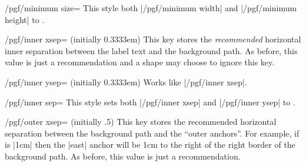 \begin{key}{/pgf/minimum size=}
    This style both |/pgf/minimum width| and |/pgf/minimum height| to .
\end{key}

\begin{key}{/pgf/inner xsep= (initially 0.3333em)}
    This key stores the \emph{recommended} horizontal inner separation between
    the label text and the background path. As before, this value is just a
    recommendation and a shape may choose to ignore this key.
\begin{codeexample}[]
\end{codeexample}
\end{key}

\begin{key}{/pgf/inner ysep= (initially 0.3333em)}
    Works like |/pgf/inner xsep|.
\end{key}

\begin{key}{/pgf/inner sep=}
    This style sets both |/pgf/inner xsep| and |/pgf/inner ysep| to
    .
\end{key}

\begin{key}{/pgf/outer xsep= (initially .5\string\pgflinewidth)}
    This key stores the recommended horizontal separation between the
    background path and the ``outer anchors''. For example, if 
    is |1cm| then the |east| anchor will be 1cm to the right of the right
    border of the background path. As before, this value is just a
    recommendation.
\begin{codeexample}[]
\end{codeexample}
\end{key}

